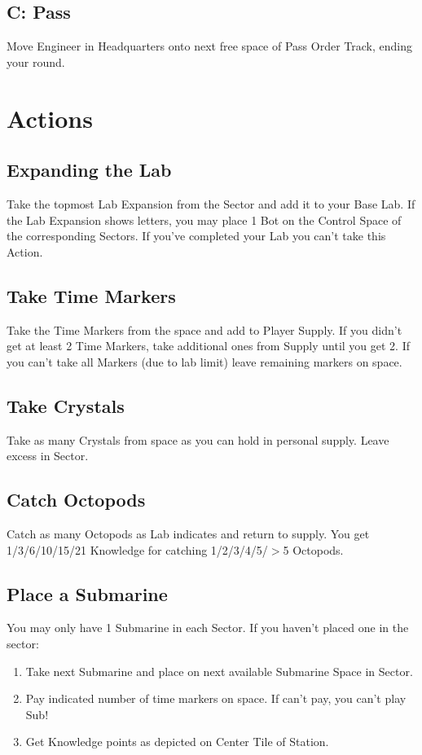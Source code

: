 \documentclass[12pt]{article}
\newenvironment{enumerateCustom}
{\begin{enumerate}
  \setlength{\itemsep}{1pt}
  \setlength{\parskip}{0pt}
  \setlength{\parsep}{0pt}}
{\end{enumerate}}
\begin{document}
\begin{multicols*}{2}
\subsection*{C: Pass}
Move Engineer in Headquarters onto next free space of Pass Order Track, ending your round.

\section*{Actions}
\subsection*{Expanding the Lab}
Take the topmost Lab Expansion from the Sector and add it to your Base Lab. If the Lab Expansion shows letters, you may place 1 Bot on the Control Space of the corresponding Sectors. If you've completed your Lab you can't take this Action.

\subsection*{Take Time Markers}
Take the Time Markers from the space and add to Player Supply. If you didn't get at least 2 Time Markers, take additional ones from Supply until you get 2. If you can't take all Markers (due to lab limit) leave remaining markers on space.

\subsection*{Take Crystals}
Take as many Crystals from space as you can hold in personal supply. Leave excess in Sector.

\subsection*{Catch Octopods}
Catch as many Octopods as Lab indicates and return to supply. You get 1/3/6/10/15/21 Knowledge for catching 1/2/3/4/5/$>$5 Octopods.

\subsection*{Place a Submarine}
You may only have 1 Submarine in each Sector. If you haven't placed one in the sector:
\begin{enumerateCustom}
    \item Take next Submarine and place on next available Submarine Space in Sector.
    \item Pay indicated number of time markers on space. If can't pay, you can't play Sub!
    \item Get Knowledge points as depicted on Center Tile of Station.
\end{enumerateCustom}


\end{multicols*}
\end{document}
